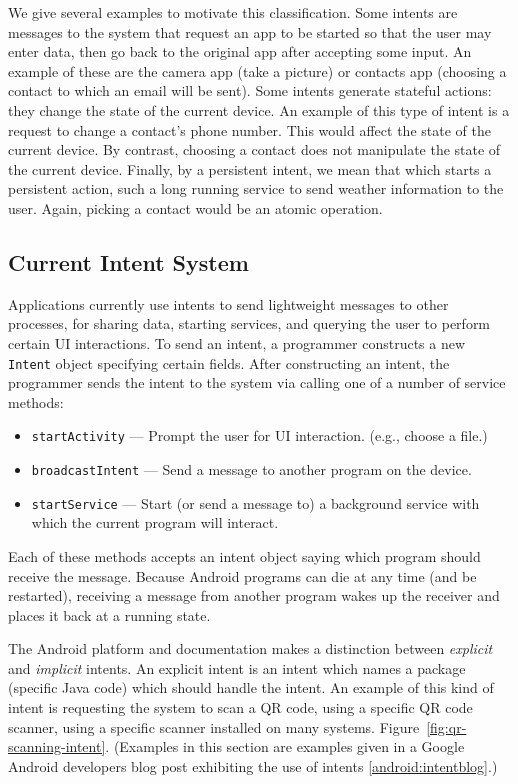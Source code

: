 \documentclass{acm_proc_article-sp}
\begin{document}
We give several examples to motivate this classification.  Some
intents are messages to the system that request an app to be started
so that the user may enter data, then go back to the original app
after accepting some input.  An example of these are the camera app
(take a picture) or contacts app (choosing a contact to which an email
will be sent).  Some intents generate stateful actions: they change
the state of the current device.  An example of this type of intent is
a request to change a contact's phone number.  This would affect the
state of the current device.  By contrast, choosing a contact does not
manipulate the state of the current device.  Finally, by a persistent
intent, we mean that which starts a persistent action, such a long
running service to send weather information to the user.  Again,
picking a contact would be an atomic operation.

\subsection{Current Intent System}

Applications currently use intents to send lightweight messages to
other processes, for sharing data, starting services, and querying the
user to perform certain UI interactions.  To send an intent, a
programmer constructs a new \texttt{Intent} object specifying certain
fields.  After constructing an intent, the programmer sends the intent
to the system via calling one of a number of service methods: 
\begin{itemize}
\item \texttt{startActivity} --- Prompt the user for UI
  interaction. (e.g., choose a file.)
\item \texttt{broadcastIntent} --- Send a message to another program
  on the device.
\item \texttt{startService} --- Start (or send a message to) a
  background service with which the current program will interact.
\end{itemize}
Each of these methods accepts an intent object saying which program
should receive the message.  Because Android programs can die at any
time (and be restarted), receiving a message from another program
wakes up the receiver and places it back at a running state.

The Android platform and documentation makes a distinction between
\emph{explicit} and \emph{implicit} intents.  An explicit intent is an
intent which names a package (specific Java code) which should handle
the intent.  An example of this kind of intent is requesting the
system to scan a QR code, using a specific QR code scanner, using a
specific scanner installed on many systems.
Figure~\ref{fig:qr-scanning-intent}.  (Examples in this section are
examples given in a Google Android developers blog post exhibiting the
use of intents \ref{android:intentblog}.)
\end{document}
